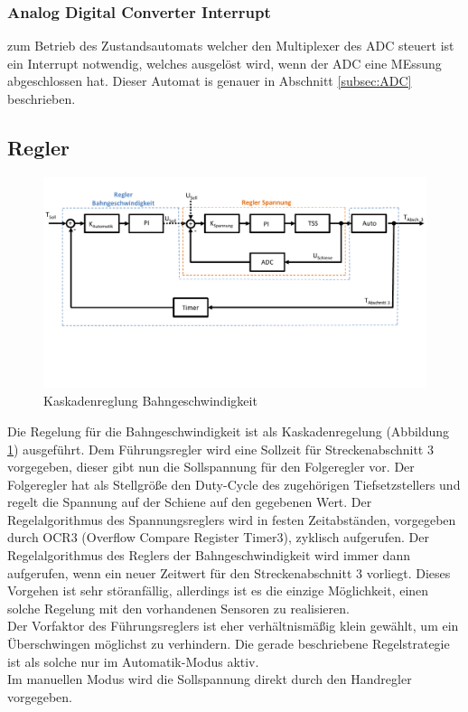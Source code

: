 \documentclass[a4paper, 11pt]{report}
\begin{document}
			\subsubsection{Analog Digital Converter Interrupt}\label{subsubsec:ADCINT}
			zum Betrieb des Zustandsautomats welcher den Multiplexer des ADC steuert ist ein Interrupt notwendig, welches ausgelöst wird, wenn der ADC eine MEssung abgeschlossen hat. Dieser Automat is genauer in Abschnitt \ref{subsec:ADC} beschrieben.

	\subsection{Regler}
		\begin{figure}[ht]
			\centering
			\includegraphics[width=\textwidth]{rec/Regler.pdf}
			\caption{Kaskadenreglung Bahngeschwindigkeit}
			\label{img:Regelung}
		\end{figure}
		Die Regelung für die Bahngeschwindigkeit ist als Kaskadenregelung (Abbildung \ref{img:Regelung}) ausgeführt.
		Dem Führungsregler wird eine Sollzeit für Streckenabschnitt 3 vorgegeben, dieser gibt nun die Sollspannung für den Folgeregler vor.
		Der Folgeregler hat als Stellgröße den Duty-Cycle des zugehörigen Tiefsetzstellers und regelt die Spannung auf der Schiene auf den gegebenen Wert.
		Der Regelalgorithmus des Spannungsreglers wird in festen Zeitabständen, vorgegeben durch OCR3 (Overflow Compare Register Timer3), zyklisch aufgerufen.
		Der Regelalgorithmus des Reglers der Bahngeschwindigkeit wird immer dann aufgerufen, wenn ein neuer Zeitwert für den Streckenabschnitt 3 vorliegt.
		Dieses Vorgehen ist sehr störanfällig, allerdings ist es die einzige Möglichkeit, einen solche Regelung mit den vorhandenen Sensoren zu realisieren. \\
		Der Vorfaktor des Führungsreglers ist eher verhältnismäßig klein gewählt, um ein Überschwingen möglichst zu verhindern.
		Die gerade beschriebene Regelstrategie ist als solche nur im Automatik-Modus aktiv.\\
		Im manuellen Modus wird die Sollspannung direkt durch den Handregler vorgegeben.
		\newpage
\end{document}
